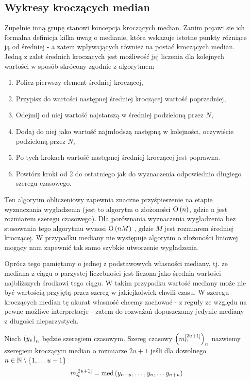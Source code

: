 \documentclass[10pt,a4paper]{book}
\begin{document}
\subsection{Wykresy kroczących median}

Zupełnie inną grupę stanowi koncepcja kroczących median. Zanim pojawi sie ich formalna definicja kilka uwag o medianie, która wskazuje istotne punkty różniące ją od średniej - a zatem wpływających również na postać kroczących median. Jedną z zalet średnich kroczących jest możliwość jej liczenia dla kolejnych wartości w sposób skrócony zgodnie z algorytmem

\begin{enumerate}
\item Policz pierwszy element średniej kroczącej,
\item Przypisz do wartości następnej średniej kroczącej wartość poprzedniej,
\item Odejmij od niej wartość najstarszą w średniej podzieloną przez $N$,
\item Dodaj do niej jako wartość najmłodszą następną w kolejności, oczywiście podzieloną przez $N$,
\item Po tych krokach wartość następnej średniej kroczącej jest poprawna.
\item Powtórz kroki od 2 do ostatniego jak do wyznaczenia odpowiednio długiego szeregu czasowego.
\end{enumerate}

Ten algorytm obliczeniowy zapewnia znaczne przyśpieszenie na etapie wyznaczania wygładzenia (jest to algorytm o złożoności $\operatorname{O} \left( {n} \right)$, gdzie n jest rozmiarem szeregu czasowego). Dla porównania wyznaczenia wygładzenia bez stosowania tego algorytmu wynosi $\operatorname{O} \left( {n M} \right)$ , gdzie $M$ jest rozmiarem średniej kroczącej. W przypadku mediany nie występuje algorytm o złożoności liniowej mogący nam zapewnić tak samo szybkie utworzenie wygładzenia.

Oprócz tego pamiętamy o jednej z podstawowych własności mediany, tj. że mediana z ciągu o parzystej liczebności jest liczona jako średnia wartości najbliższych środkowi tego ciągu. W takim przypadku wartość mediany może nie być wartością przyjętą przez szereg w jakiejkolwiek chwili czasu.  W szeregu kroczących median tę akurat własność chcemy zachować - z reguły ze względu na pewne możliwe interpretacje - zatem do rozważań dopuszczamy jedynie mediany z długości nieparzystych.

\begin{definition}
Niech $\left( {y_n} \right)_{n}^{} $ będzie szeregiem czasowym. Szereg czasowy $\left( {m^{[2u+1]}_n} \right)_{n}^{}$ nazwiemy szeregiem kroczącym median o rozmiarze $2u+1$ jeśli dla dowolnego $n \in \mathbb{N} \setminus \left\lbrace {1,\ldots u-1} \right\rbrace $
$$
m^{[2u+1]}_n = \median{y_{n-u}, \ldots, y_n, \ldots y_{n+u}}
$$  
\end{definition}
\end{document}
